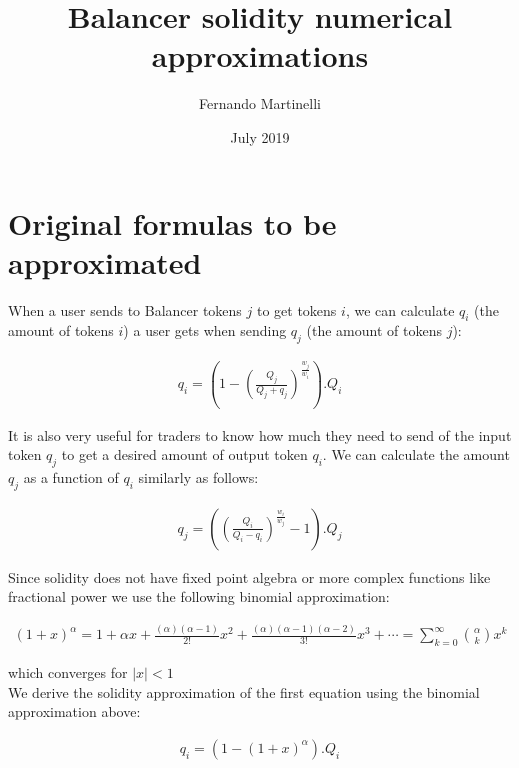 \documentclass[11pt]{amsart}
\title{Balancer solidity numerical approximations}
\author{Fernando Martinelli}
\date{July 2019}                                 %
\begin{document}
\maketitle
\section{Original formulas to be approximated}

When a user sends to Balancer tokens $j$ to get tokens $i$, we can calculate $q_i$ (the amount of tokens $i$) a user gets when sending $q_j$ (the amount of tokens $j$):

\begin{equation}
\begin{gathered}
q_i = \left(1 - \left(\frac{Q_j}{Q_j+q_j}\right)^{\frac{w_j}{w_i}}\right).Q_i
\end{gathered}
\end{equation}

It is also very useful for traders to know how much they need to send of the input token $q_j$ to get a desired amount of output token $q_i$. We can calculate the amount $q_j$ as a function of $q_i$ similarly as follows:

\begin{equation}
\begin{gathered}
q_j = \left(\left(\frac{Q_i}{Q_i-q_i}\right)^{\frac{w_i}{w_j}}-1\right).Q_j
\end{gathered}
\end{equation}

Since solidity does not have fixed point algebra or more complex functions like fractional power we use the following binomial approximation:

\begin{equation}
\begin{gathered}
\left(1+x\right)^\alpha=1+\alpha x+\frac{(\alpha)(\alpha-1)}{2!}x^2+
\frac{(\alpha)(\alpha-1)(\alpha-2)}{3!}x^3+
\cdots = \sum_{k=0}^{\infty}{\alpha \choose k}x^k
\end{gathered}
\end{equation}

which converges for ${|x| < 1}$
\\
We derive the solidity approximation of the first equation using the binomial approximation above:

\begin{equation}
\begin{gathered}
q_i = \left(1 - \left(1+x\right)^{\alpha}\right).Q_i
\end{gathered}
\end{equation}
\end{document}
